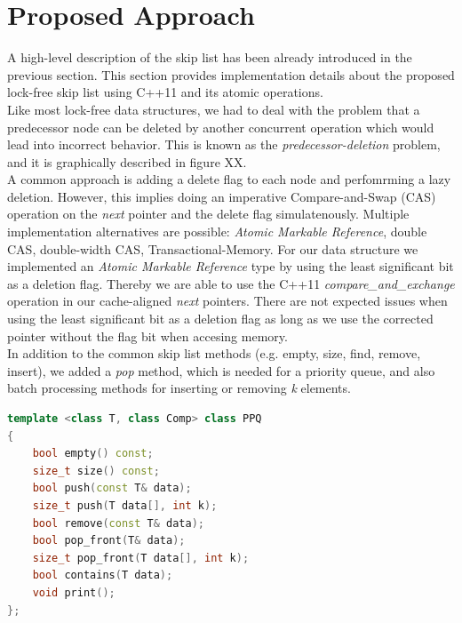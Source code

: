 \section{Proposed Approach}\label{sec:approach}
A high-level description of the skip list has been already introduced in the previous section. This section provides implementation details about the proposed lock-free skip list using C++11 and its atomic operations.\\
Like most lock-free data structures, we had to deal with the problem that a predecessor node can be deleted by another concurrent operation which would lead into incorrect behavior. This is known as the {\em predecessor-deletion} problem, and it is graphically described in figure XX.\\%
A common approach is adding a delete flag to each node and perfomrming a lazy deletion. However, this implies doing an imperative Compare-and-Swap (CAS) operation on the {\em next} pointer and the delete flag simulatenously. Multiple implementation alternatives are possible: {\em Atomic Markable Reference}, double CAS, double-width CAS, Transactional-Memory. For our data structure we implemented an {\em Atomic Markable Reference} type by using the least significant bit as a deletion flag. Thereby we are able to use the C++11 {\em compare\_and\_exchange} operation in our cache-aligned {\em next} pointers.%
There are not expected issues when using the least significant bit as a deletion flag as long as we use the corrected pointer without the flag bit when accesing memory.\\
In addition to the common skip list methods (e.g. empty, size, find, remove, insert), we added a \textit{pop} method, which is needed for a priority queue, and also batch processing methods for inserting or removing \textit{k} elements.\\


\begin{lstlisting}[language=C++,basicstyle=\tt\footnotesize,captionpos=b,caption=PPQ interface,morekeywords={*, size_t}]
template <class T, class Comp> class PPQ
{
	bool empty() const;
	size_t size() const;
	bool push(const T& data);
	size_t push(T data[], int k);
	bool remove(const T& data);
	bool pop_front(T& data);
	size_t pop_front(T data[], int k);
	bool contains(T data);
	void print();
};
\end{lstlisting}

